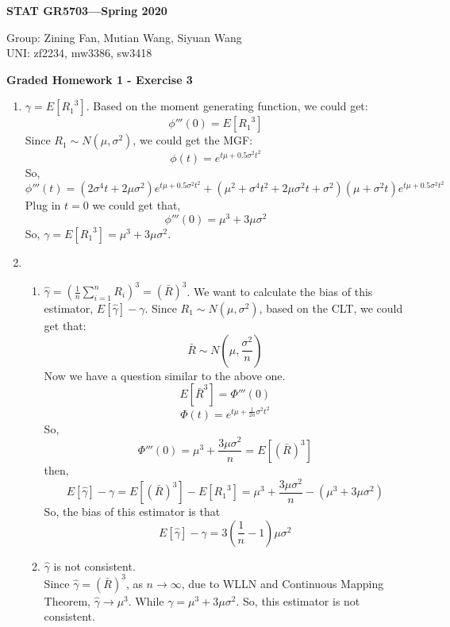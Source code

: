 \documentclass[11pt]{article}
\begin{document}
\begin{flushright}
{\bf STAT GR5703---Spring 2020}
\end{flushright}
\begin{flushleft}
Group: Zining Fan, Mutian Wang, Siyuan Wang\\
UNI: zf2234, mw3386, sw3418\\
\end{flushleft}

\bigskip
\centerline{\bf Graded Homework 1 - Exercise 3}

\bigskip 
\begin{enumerate}
    \item \par
    $\gamma=E[{R_1}^3]$. Based on the moment generating function, we could get:
    \[\phi'''(0)=E[{R_1}^3]\]
    Since $R_1\sim N(\mu,\sigma^2)$, we could get the MGF:
    \[\phi(t)=e^{t\mu+0.5\sigma^2t^2}\]
    So, 
    \[\phi'''(t)=(2\sigma^4t+2\mu\sigma^2)e^{t\mu+0.5\sigma^2t^2}+(\mu^2+\sigma^4t^2+2\mu\sigma^2t+\sigma^2)(\mu+\sigma^2t)e^{t\mu+0.5\sigma^2t^2}\]
    Plug in $t=0$ we could get that,
    \[\phi'''(0)=\mu^3+3\mu\sigma^2\]
    So, $\gamma = E[{R_1}^3]=\mu^3+3\mu\sigma^2$. 
    
    \item
    \begin{enumerate}
        \item 
	$\hat{\gamma}=(\frac{1}{n}\sum_{i=1}^{n} R_i)^3=(\bar{R})^3$. We want to calculate the bias of this estimator, $E[\hat{\gamma}]-\gamma$. Since $R_1\sim N(\mu,\sigma^2)$, based on the CLT, we could get that:
        \[\bar{R}\sim N(\mu,\frac{\sigma^2}{n})\]
        Now we have a question similar to the above one. 
        \[E[{\bar{R}}^3]=\Phi'''(0)\]
        \[\Phi(t)=e^{t\mu+\frac{1}{2n}\sigma^2t^2}\]
        So, 
        \[\Phi'''(0)=\mu^3+\frac{3\mu\sigma^2}{n} = E[(\bar{R})^3]\]
        then,
        \[E[\hat{\gamma}]-\gamma=E[(\bar{R})^3]-E[{R_1}^3]=\mu^3+\frac{3\mu\sigma^2}{n}-(\mu^3+3\mu\sigma^2)\]
        So, the bias of this estimator is that 
        \[E[\hat{\gamma}]-\gamma=3(\frac{1}{n}-1)\mu\sigma^2\]
        
        
        \item \par
        $\hat{\gamma}$ is not consistent.
        \\Since $\hat{\gamma}=(\bar{R})^3$, as $n\rightarrow\infty$, due to WLLN and Continuous Mapping Theorem,  $\hat{\gamma}\rightarrow\mu^3$. While $\gamma=\mu^3+3\mu\sigma^2$. So, this estimator is not consistent. 
    \end{enumerate}
    

\end{enumerate}
\end{document}
